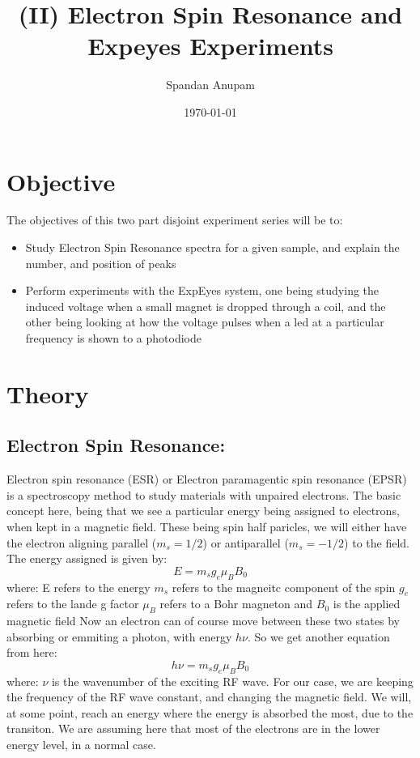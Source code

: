 \documentclass{multi}
\title{\textbf{(II) Electron Spin Resonance and Expeyes Experiments}}
\author{
Spandan Anupam
}
\date{\today}
\begin{document}
\maketitle
\section{Objective}
\label{sec:intro}
The objectives of this two part disjoint experiment series will be to:
\begin{itemize}
	\item Study Electron Spin Resonance spectra for a given sample, and explain the number, and position of peaks
	\item Perform experiments with the ExpEyes system, one being studying the induced voltage when a small magnet is dropped through a coil, and the other being looking at how the voltage pulses when a led at a particular frequency is shown to a photodiode
\end{itemize}
\section{Theory}
\subsection{Electron Spin Resonance:}
	Electron spin resonance (ESR) or Electron paramagentic spin resonance (EPSR) is a spectroscopy method to study materials with unpaired electrons. The basic concept here, being that we see a particular energy being assigned to electrons, when kept in a magnetic field. These being spin half paricles, we will either have the electron aligning parallel ($m_s = 1/2$) or antiparallel ($m_s = -1/2$) to the field. The energy assigned is given by:
	\begin{equation}
		E = m_s g_e \mu_B B_0
	\end{equation}
	where:
	\newline E refers to the energy
	\newline $m_s$ refers to the magneitc component of the spin
	\newline $g_e$ refers to the lande g factor
	\newline $\mu_B$ refers to a Bohr magneton
	\newline and $B_0$ is the applied magnetic field
	Now an electron can of course move between these two states by absorbing or emmiting a photon, with energy $h\nu$. So we get another equation from here:
	\begin{equation}
		h\nu=m_s g_e \mu_B B_0
	\end{equation}
	where:
	\newline $\nu$ is the wavenumber of the exciting RF wave.
	For our case, we are keeping the frequency of the RF wave constant, and changing the magnetic field. We will, at some point, reach an energy where the energy is absorbed the most, due to the transiton. We are assuming here that most of the electrons are in the lower energy level, in a normal case.
\end{document}
